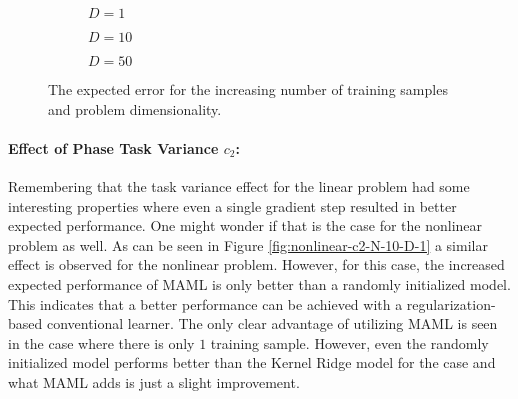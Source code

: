 \begin{figure}[!h]
  \centering
    \begin{subfigure}{0.3\textwidth}
      \centering
      \caption{$D=1$}
      \label{fig:nonlinear-N-D-1}
    \end{subfigure}
    \begin{subfigure}{0.3\textwidth}
      \centering
      \caption{$D=10$}
      \label{fig:nonlinear-N-D-10}
    \end{subfigure}
    \begin{subfigure}{0.3\textwidth}
      \centering
      \caption{$D=50$}
      \label{fig:nonlinear-N-D-50}
    \end{subfigure}
  \caption{The expected error for the increasing number of training samples and problem dimensionality.}\label{fig:nonlinear-N}
\end{figure}


\paragraph{Effect of Phase Task Variance $c_2$:} Remembering that the task variance effect for the linear problem had some interesting properties where even a single gradient step resulted in better expected performance. One might wonder if that is the case for the nonlinear problem as well. As can be seen in Figure \ref{fig:nonlinear-c2-N-10-D-1} a similar effect is observed for the nonlinear problem. However, for this case, the increased expected performance of MAML is only better than a randomly initialized model. This indicates that a better performance can be achieved with a regularization-based conventional learner. The only clear advantage of utilizing MAML is seen in the case where there is only $1$ training sample. However, even the randomly initialized model performs better than the Kernel Ridge model for the case and what MAML adds is just a slight improvement. 

